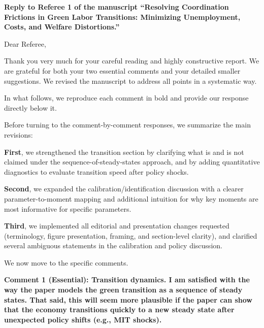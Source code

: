 \documentclass[12pt]{article}
\begin{document}
\theoremstyle{definition}
\newtheorem{definition}{Definition}
\theoremstyle{definition}
\newtheorem{result}{Result}
\theoremstyle{plain}
\newtheorem{lemma}{Lemma}
\theoremstyle{plain}
\newtheorem{proposition}{Proposition}
\theoremstyle{plain}
\newtheorem{theorem}{Theorem}
\theoremstyle{plain}
\newtheorem{corollary}{Corollary}

\begin{onehalfspacing}

\vspace{1.0cm}

\noindent \textbf{Reply to Referee 1 of the manuscript ``Resolving Coordination Frictions in Green Labor Transitions: Minimizing Unemployment, Costs, and Welfare Distortions.''}

\bigskip

Dear Referee,

\medskip

Thank you very much for your careful reading and highly constructive report. We are grateful for both your two essential comments and your detailed smaller suggestions. We revised the manuscript to address all points in a systematic way.

In what follows, we reproduce each comment in bold and provide our response directly below it.

Before turning to the comment-by-comment responses, we summarize the main revisions:

\textbf{First}, we strengthened the transition section by clarifying what is and is not claimed under the sequence-of-steady-states approach, and by adding quantitative diagnostics to evaluate transition speed after policy shocks.

\textbf{Second}, we expanded the calibration/identification discussion with a clearer parameter-to-moment mapping and additional intuition for why key moments are most informative for specific parameters.

\textbf{Third}, we implemented all editorial and presentation changes requested (terminology, figure presentation, framing, and section-level clarity), and clarified several ambiguous statements in the calibration and policy discussion.

We now move to the specific comments.

\bigskip
\bigskip

\textbf{Comment 1 (Essential): Transition dynamics. I am satisfied with the way the paper models the green transition as a sequence of steady states. That said, this will seem more plausible if the paper can show that the economy transitions quickly to a new steady state after unexpected policy shifts (e.g., MIT shocks).}


\end{onehalfspacing}
\end{document}
